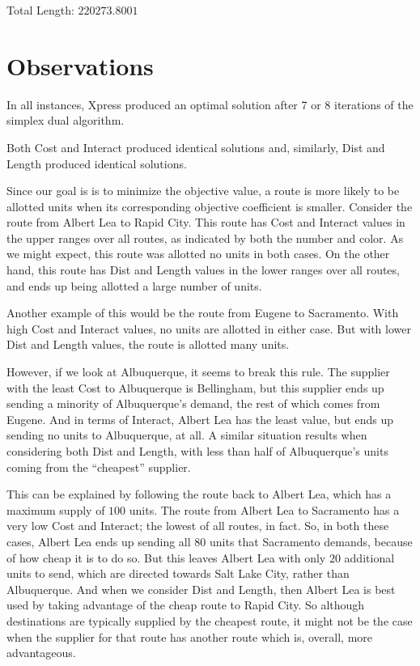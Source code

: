 \documentclass[12pt]{article}
\theoremstyle{definition}
\begin{document}
Total Length: $220273.8001$

\newpage
\section{Observations}

In all instances, Xpress produced an optimal solution after 7 or 8 iterations of the simplex dual algorithm.

Both Cost and Interact produced identical solutions and, similarly, Dist and Length produced identical solutions.

Since our goal is is to minimize the objective value, a route is more likely to be allotted units when its corresponding objective coefficient is smaller. Consider the route from Albert Lea to Rapid City. This route has Cost and Interact values in the upper ranges over all routes, as indicated by both the number and color. As we might expect, this route was allotted no units in both cases. On the other hand, this route has Dist and Length values in the lower ranges over all routes, and ends up being allotted a large number of units.

Another example of this would be the route from Eugene to Sacramento. With high Cost and Interact values, no units are allotted in either case. But with lower Dist and Length values, the route is allotted many units.

However, if we look at Albuquerque, it seems to break this rule. The supplier with the least Cost to Albuquerque is Bellingham, but this supplier ends up sending a minority of Albuquerque's demand, the rest of which comes from Eugene. And in terms of Interact, Albert Lea has the least value, but ends up sending no units to Albuquerque, at all. A similar situation results when considering both Dist and Length, with less than half of Albuquerque's units coming from the ``cheapest'' supplier.

This can be explained by following the route back to Albert Lea, which has a maximum supply of $100$ units. The route from Albert Lea to Sacramento has a very low Cost and Interact; the lowest of all routes, in fact. So, in both these cases, Albert Lea ends up sending all $80$ units that Sacramento demands, because of how cheap it is to do so. But this leaves Albert Lea with only $20$ additional units to send, which are directed towards Salt Lake City, rather than Albuquerque. And when we consider Dist and Length, then Albert Lea is best used by taking advantage of the cheap route to Rapid City. So although destinations are typically supplied by the cheapest route, it might not be the case when the supplier for that route has another route which is, overall, more advantageous. 
\end{document}
